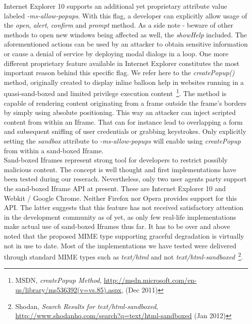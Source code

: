    Internet Explorer 10 supports an additional yet proprietary attribute value labeled \textit{-ms-allow-popups}. With this flag, a developer can explicitly allow usage of the \textit{open}, \textit{alert}, \textit{confirm} and \textit{prompt} method. As a side note - beware of other methods to open new windows being affected as well, the \textit{showHelp} included. The aforementioned actions can be used by an attacker to obtain sensitive information or cause a denial of service by deploying modal dialogs in a loop. One more different proprietary feature available in Internet Explorer constitutes the most important reason behind this specific flag. We refer here to the \textit{createPopup()} method, originally created to display inline balloon help in websites running in a quasi-sand-boxed and limited privilege execution content~\footnote{MSDN, \textit{createPopup Method}, \url{http://msdn.microsoft.com/en-us/library/ms536392(v=vs.85).aspx}, (Dec 2011)}. The method is capable of rendering content 
originating from a frame outside the frame's borders by simply using absolute positioning. This way an attacker can inject scripted content from within an Iframe. That can for instance lead to overlapping a form and subsequent sniffing of user credentials or grabbing keystrokes. Only explicitly setting the \textit{sandbox} attribute to \textit{-ms-allow-popups} will enable using \textit{createPopup} from within a sand-boxed Iframe.\\

    Sand-boxed Iframes represent strong tool for developers to restrict possibly malicious content. The concept is well thought and first implementations have been tested during our reserach. Nevertheless, only two user agents party support the sand-boxed Iframe API at present. These are Internet Explorer 10 and Webkit / Google Chrome. Neither Firefox nor Opera provides support for this API. The latter suggests that this feature has not received satisfactory attention in the development community as of yet, as only few real-life implementations make actual use of sand-boxed Iframes thus far. It has to be over and above noted that the proposed MIME type supporting graceful degradation is virtually not in use to date. Most of the implementations we have tested were delivered through standard MIME types such as \textit{text/html} and not \textit{text/html-sandboxed}~\footnote{Shodan, \textit{Search Results for text/html-sandboxed}, \url{http://www.shodanhq.com/search?q=text/html-sandboxed} (Jan 2012)}.


